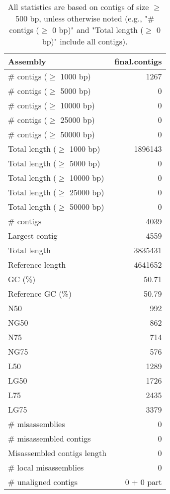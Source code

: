 \documentclass[12pt,a4paper]{article}
\begin{document}
\begin{table}[ht]
\begin{center}
\caption{All statistics are based on contigs of size $\geq$ 500 bp, unless otherwise noted (e.g., "\# contigs ($\geq$ 0 bp)" and "Total length ($\geq$ 0 bp)" include all contigs).}
\begin{tabular}{|l*{1}{|r}|}
\hline
Assembly & final.contigs \\ \hline
\# contigs ($\geq$ 1000 bp) & 1267 \\ \hline
\# contigs ($\geq$ 5000 bp) & 0 \\ \hline
\# contigs ($\geq$ 10000 bp) & 0 \\ \hline
\# contigs ($\geq$ 25000 bp) & 0 \\ \hline
\# contigs ($\geq$ 50000 bp) & 0 \\ \hline
Total length ($\geq$ 1000 bp) & 1896143 \\ \hline
Total length ($\geq$ 5000 bp) & 0 \\ \hline
Total length ($\geq$ 10000 bp) & 0 \\ \hline
Total length ($\geq$ 25000 bp) & 0 \\ \hline
Total length ($\geq$ 50000 bp) & 0 \\ \hline
\# contigs & 4039 \\ \hline
Largest contig & 4559 \\ \hline
Total length & 3835431 \\ \hline
Reference length & 4641652 \\ \hline
GC (\%) & 50.71 \\ \hline
Reference GC (\%) & 50.79 \\ \hline
N50 & 992 \\ \hline
NG50 & 862 \\ \hline
N75 & 714 \\ \hline
NG75 & 576 \\ \hline
L50 & 1289 \\ \hline
LG50 & 1726 \\ \hline
L75 & 2435 \\ \hline
LG75 & 3379 \\ \hline
\# misassemblies & 0 \\ \hline
\# misassembled contigs & 0 \\ \hline
Misassembled contigs length & 0 \\ \hline
\# local misassemblies & 0 \\ \hline
\# unaligned contigs & 0 + 0 part \\ \hline

\end{tabular}
\end{center}
\end{table}
\end{document}
